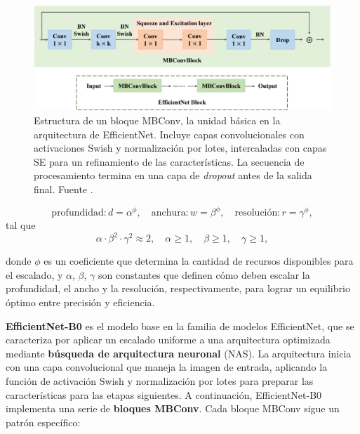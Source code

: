 \begin{figure}
	\centering
	\includegraphics[width=140mm]{img/mbconv.jpg}
	\caption{Estructura de un bloque MBConv, la unidad básica en la arquitectura de
		EfficientNet. Incluye capas convolucionales con activaciones Swish y
		normalización por lotes, intercaladas con capas SE para un refinamiento de las
		características. La secuencia de procesamiento termina en una capa de \textit{dropout}
		antes de la salida final. Fuente \cite{TANG2024105605}.}
\end{figure}

\begin{equation}
	\text{profundidad}: d = \alpha^{\phi}, \quad \text{anchura}: w = \beta^{\phi},
	\quad \text{resolución}: r = \gamma^{\phi},
\end{equation}
tal que
\[
\alpha \cdot \beta^{2} \cdot \gamma^{2} \approx 2, \quad \alpha \geq 1, \quad \beta
\geq 1, \quad \gamma \geq 1,
\]

donde $\phi$ es un coeficiente que determina la cantidad de recursos disponibles
para el escalado, y $\alpha$, $\beta$, $\gamma$ son constantes que definen cómo deben
escalar la profundidad, el ancho y la resolución, respectivamente, para lograr
un equilibrio óptimo entre precisión y eficiencia.

\textbf{EfficientNet-B0} es el modelo base en la familia de modelos EfficientNet,
que se caracteriza por aplicar un escalado uniforme a una arquitectura
optimizada mediante \textbf{búsqueda de arquitectura neuronal} (NAS). La
arquitectura inicia con una capa convolucional que maneja la imagen de entrada, aplicando
la función de activación Swish y normalización por lotes para preparar las características
para las etapas siguientes. A continuación, EfficientNet-B0 implementa una serie
de \textbf{bloques MBConv}. Cada bloque MBConv sigue un patrón específico:

